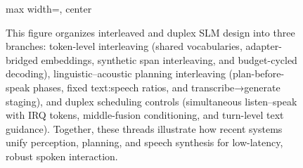 \begin{figure}[h]
\begin{adjustbox}{max width=\textwidth, center}
\end{adjustbox}

\caption{This figure organizes interleaved and duplex SLM design into three branches: token-level interleaving (shared vocabularies, adapter-bridged embeddings, synthetic span interleaving, and budget-cycled decoding), linguistic–acoustic planning interleaving (plan-before-speak phases, fixed text:speech ratios, and transcribe→generate staging), and duplex scheduling controls (simultaneous listen–speak with IRQ tokens, middle-fusion conditioning, and turn-level text guidance). Together, these threads illustrate how recent systems unify perception, planning, and speech synthesis for low-latency, robust spoken interaction.}
\label{fig:tiny_tree_figure_3}

\end{figure}